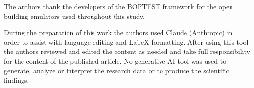 \documentclass{ieeeaccess}
\begin{document}
The authors thank the developers of the BOPTEST framework for the open building
emulators used throughout this study.

During the preparation of this work the authors used Claude (Anthropic) in order
to assist with language editing and \LaTeX{} formatting. After using this tool
the authors reviewed and edited the content as needed and take full
responsibility for the content of the published article. No generative AI tool
was used to generate, analyze or interpret the research data or to produce the
scientific findings.




%
%
%
\end{document}
